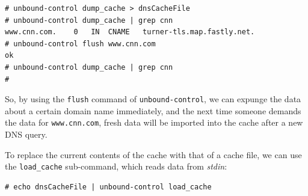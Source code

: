 \vspace{-15pt}
\begin{verbatim}
# unbound-control dump_cache > dnsCacheFile
# unbound-control dump_cache | grep cnn
www.cnn.com.	0	IN	CNAME	turner-tls.map.fastly.net.
# unbound-control flush www.cnn.com
ok
# unbound-control dump_cache | grep cnn
#
\end{verbatim}
\vspace{-10pt}	

\noindent
So, by using the \verb|flush| command of \verb|unbound-control|, we can expunge the data about a certain domain name immediately, and the next time someone demands the data for \verb|www.cnn.com|, fresh data will be imported into the cache after a new DNS query. 

To replace the current contents of the cache with that of a cache file, we can use the \verb|load_cache| sub-command, which reads data from \textit{stdin}:

\vspace{-15pt}
\begin{verbatim}
# echo dnsCacheFile | unbound-control load_cache
\end{verbatim}